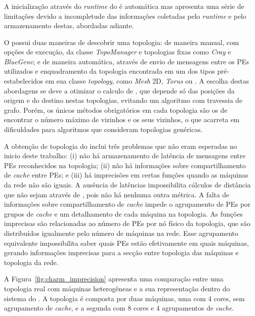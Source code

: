 \subsubsection{\charm}
\label{sec:init:charm}
A inicialização através do \textit{runtime} do \charm é automática mas apresenta uma série de limitações devido a incompletude das informações coletadas pelo \textit{runtime} e pelo armazenamento destas, abordadas adiante.

O \charm possui duas maneiras de descobrir uma topologia: de maneira manual, com opções de execução, da classe \textit{TopoManager} e topologias fixas como \textit{Cray} e \textit{BlueGene}; e de maneira automática, através de envio de mensagens entre os PEs utilizados e enquadramento da topologia encontrada em um dos tipos pré-estabelecidos em sua classe \textit{topology}, como \textit{Mesh} 2D, \textit{Torus} ou \Fatt. 
A escolha destas abordagens se deve a otimizar o calculo de \hops, que depende só das posições da origem e do destino nestas topologias, evitando um algoritmo com travessia de grafo.
Porém, os únicos métodos obrigatórios em cada topologia são os de encontrar o número máximo de vizinhos e os seus vizinhos, o que acarreta em dificuldades para algoritmos que consideram topologias genéricas.

A obtenção de topologia do \charm inclui três problemas que não eram esperadas no inicio deste trabalho:
(i) não há armazenamento de latência de mensagens entre PEs reconhecidos na topologia; (ii) não há informações sobre compartilhamento de \textit{cache} entre PEs; e (iii) há imprecisões em certas funções quando as máquinas da rede não são iguais.
A ausência de latências impossibilita cálculos de distância que não sejam através de \hops, pois não há nenhuma outra métrica.
A falta de informações sobre compartilhamento de \textit{cache} impede o agrupamento de PEs por grupos de \textit{cache} e um detalhamento de cada máquina na topologia.
As funções imprecisas são relacionadas ao número de PEs por nó físico da topologia, que são distribuídos igualmente pelo número de máquinas na rede.
Esse agrupamento equivalente impossibilita saber quais PEs estão efetivamente em quais máquinas, gerando informações imprecisas para a secção entre topologia das máquinas e topologia da rede.

A Figura~\ref{fig:charm_imprecision} apresenta uma comparação entre uma topologia real com máquinas heterogêneas e a sua representação dentro do sistema do \charm. A topologia é composta por duas máquinas, uma com 4 cores, sem agrupamento de \textit{cache}, e a segunda com 8 cores e 4 agrupamentos de \textit{cache}.

